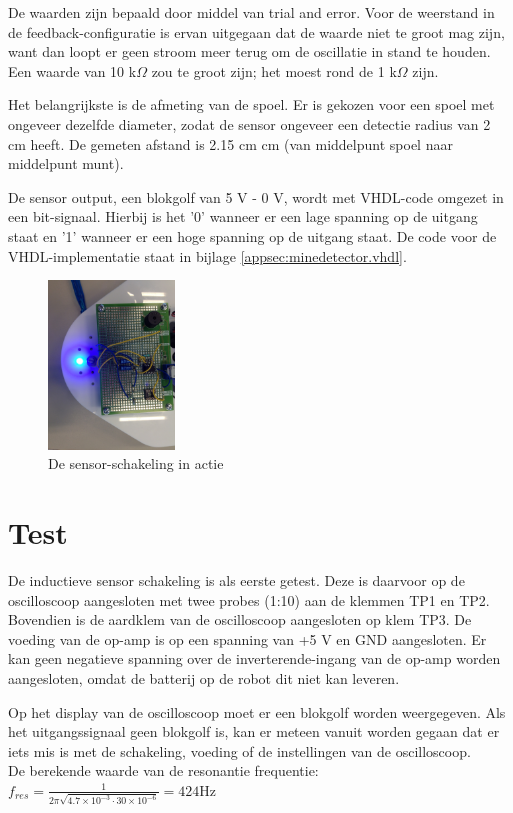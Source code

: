 \documentclass{report}
\begin{document}
\noindent
De waarden zijn bepaald door middel van trial and error. Voor de weerstand in de feedback-configuratie is ervan uitgegaan dat de waarde niet te groot mag zijn, want dan loopt er geen stroom meer terug om de oscillatie in stand te houden. Een waarde van 10 k$\Omega$ zou te groot zijn; het moest rond de 1 k$\Omega$ zijn.

Het belangrijkste is de afmeting van de spoel. Er is gekozen voor een spoel met ongeveer dezelfde diameter, zodat de sensor ongeveer een detectie radius van 2 cm heeft. De gemeten afstand is 2.15 cm  cm (van middelpunt spoel naar middelpunt munt).

De sensor output, een blokgolf van 5 V - 0 V, wordt met VHDL-code omgezet in een bit-signaal. Hierbij is het '0' wanneer er een lage spanning op de uitgang staat en '1' wanneer er een hoge spanning op de uitgang staat. De code voor de VHDL-implementatie staat in bijlage \ref{appsec:minedetector.vhdl}.

\begin{figure}[H]
	\centering
	\includegraphics[width=0.3\textwidth]{sensor-schakeling.jpg}
	\caption{De sensor-schakeling in actie}
	\label{fig:sensor-schakeling}
\end{figure}

\section{Test}
De inductieve sensor schakeling is als eerste getest. Deze is daarvoor op de oscilloscoop aangesloten met twee probes (1:10) aan de klemmen TP1 en TP2. Bovendien is de aardklem van de oscilloscoop aangesloten op klem TP3. De voeding van de op-amp is op een spanning van +5 V en GND aangesloten. Er kan geen negatieve spanning over de inverterende-ingang van de op-amp worden aangesloten, omdat de batterij op de robot dit niet kan leveren. 

Op het display van de oscilloscoop moet er een blokgolf worden weergegeven. Als het uitgangssignaal geen blokgolf is, kan er meteen vanuit worden gegaan dat er iets mis is met de schakeling, voeding of de instellingen van de oscilloscoop.\\
De berekende waarde van de resonantie frequentie:
$f_{res}=\frac{1}{2\pi \sqrt{4.7\times 10^{-3}\cdot 30\times 10^{-6}}}= 424 \mathrm{Hz}$
\end{document}
